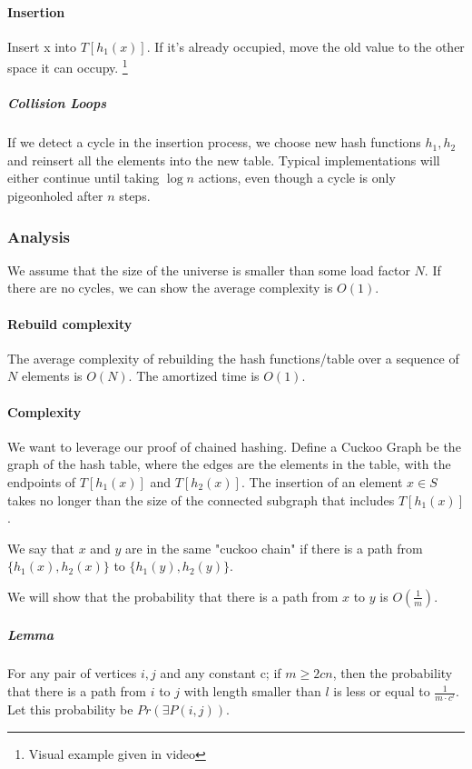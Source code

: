 \documentclass[a4paper]{article}
\begin{document}
\paragraph{Insertion}
Insert x into $T[h_1(x)]$. If it's already occupied, move the old value to the other space it can occupy.
\footnote{Visual example given in video}

\subparagraph{Collision Loops}
If we detect a cycle in the insertion process, we choose new hash functions $h_1, h_2$ and reinsert all the elements into the new table. Typical implementations will either continue until taking $\log n$ actions, even though a cycle is only pigeonholed after $n$ steps.

\subsubsection{Analysis}
We assume that the size of the universe is smaller than some load factor $N$. If there are no cycles, we can show the average complexity is $O(1)$.

\paragraph{Rebuild complexity}
The average complexity of rebuilding the hash functions/table over a sequence of $N$ elements is $O(N)$. The amortized time is $O(1)$.

\paragraph{Complexity}
We want to leverage our proof of chained hashing. Define a Cuckoo Graph be the graph of the hash table, where the edges are the elements in the table, with the endpoints of $T[h_1(x)]$ and $T[h_2(x)]$. The insertion of an element $x\in S$ takes no longer than the size of the connected subgraph that includes $T[h_1(x)]$.

We say that $x$ and $y$ are in the same "cuckoo chain" if there is a path from $\{h_1(x), h_2(x)\}$ to $\{h_1(y), h_2(y)\}$.

We will show that the probability that there is a path from $x$ to $y$ is $O(\frac{1}{m})$.

\subparagraph{Lemma}
For any pair of vertices $i,j$ and any constant c; if $m\ge2cn$, then the probability that there is a path from $i$ to $j$ with length smaller than $l$ is less or equal to $\frac{1}{m\cdot c^l}$. Let this probability be $Pr(\exists P(i,j))$.
\end{document}
